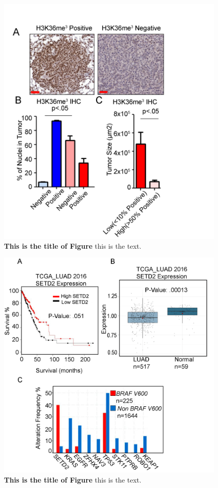 \begin{figure}
\hypertarget{fig:08}{%
\centering
\includegraphics[width=1\textwidth,height=\textheight]{images/tuba5.png}
\caption{\textbf{This is the title of Figure} this is the text.}\label{fig:08}
}
\end{figure}

\begin{figure}
\hypertarget{fig:09}{%
\centering
\includegraphics[width=1\textwidth,height=\textheight]{images/tuba6.png}
\caption{\textbf{This is the title of Figure} this is the text.}\label{fig:09}
}
\end{figure}

